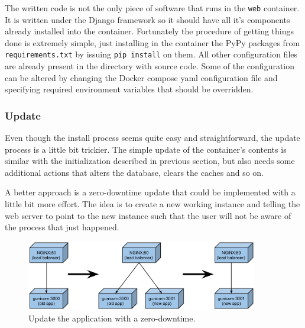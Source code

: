 \documentclass[12pt,oneside,a4paper]{article}
\begin{document}
The written code is not the only piece of software that runs in the \texttt{web} container. It is written under the Django framework so it should have all it's components already installed into the container. Fortunately the procedure of getting things done is extremely simple, just installing in the container the PyPy packages from \texttt{requirements.txt} by issuing \texttt{pip install} on them. All other configuration files are already present in the directory with source code. Some of the configuration can be altered by changing the Docker compose yaml configuration file and specifying required environment variables that should be overridden.

\subsubsection{Update}
Even though the install process seems quite easy and straightforward, the update process is a little bit trickier. The simple update of the container's contents is similar with the initialization described in previous section, but also needs some additional actions that alters the database, clears the caches and so on.

A better approach is a zero-downtime update that could be implemented with a little bit more effort. The idea is to create a new working instance and telling the web server to point to the new instance such that the user will not be aware of the process that just happened.

\begin{figure}[!ht]
  \centering
    \includegraphics[width=0.9\textwidth]{pic/deployment-zero-downtime-update.pdf}
    \caption{Update the application with a zero-downtime.}
    \label{fig:deployment-zero-downtime-update}
\end{figure}
\end{document}
